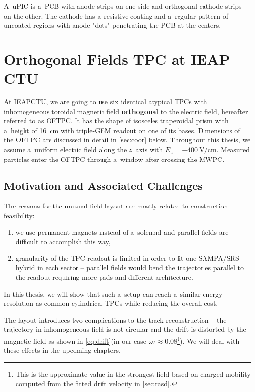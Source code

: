 				A~\ac{uPIC} is a~\ac{PCB} with anode strips on one side and orthogonal cathode strips on the other. The cathode has a~resistive coating and a~regular pattern of uncoated regions with anode "dots" penetrating the \ac{PCB} at the centers.
	
	\section{Orthogonal Fields TPC at IEAP CTU}
	\label{sec:oftpc}
		At \ac{IEAPCTU}, we are going to use six identical atypical \acp{TPC} with inhomogeneous toroidal magnetic field \textbf{orthogonal} to the electric field, hereafter referred to as \acf{OFTPC}. It has the shape of isosceles trapezoidal prism with a~height of \qty{16}{\cm} with triple\nobreakdash-\ac{GEM} readout on one of its bases. Dimensions of the \ac{OFTPC} are discussed in detail in \cref{sec:coor} below. Throughout this thesis, we assume a~uniform electric field along the $z$~axis with $E_z = -\qty{400}{\V\per\cm}$. Measured particles enter the \ac{OFTPC} through a~window after crossing the \ac{MWPC}.
		
		
		\subsection{Motivation and Associated Challenges}
			The reasons for the unusual field layout are mostly related to construction feasibility:
				\begin{enumerate}[nosep,label=\alph*)]
					\item we use permanent magnets instead of a~solenoid and parallel fields are difficult to accomplish this way,
					\item granularity of the \ac{TPC} readout is limited in order to fit one SAMPA/SRS hybrid in each sector -- parallel fields would bend the trajectories parallel to the readout requiring more pads and different architecture.
				\end{enumerate}
			In this thesis, we will show that such a~setup can reach a~similar energy resolution as common cylindrical \acp{TPC} while reducing the overall cost.
			
			The layout introduces two complications to the track reconstruction -- the trajectory in inhomogeneous field is not circular and the drift is distorted by the magnetic field as shown in \cref{eq:drift}(in our case $\omega\tau \approx 0.08$\footnote{This is the approximate value in the strongest field based on charged mobility computed from the fitted drift velocity in \cref{sec:rasd}.}). We will deal with these effects in the upcoming chapters.
			
